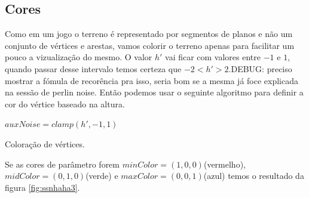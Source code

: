 \subsection{Cores}
Como em um jogo o terreno é representado por segmentos de planos e não um conjunto
de vértices e arestas, vamos colorir o terreno apenas para facilitar um pouco a
vizualização do mesmo. O valor $h'$ vai ficar com valores entre $-1$ e $1$, 
quando passar desse intervalo temos certeza que $-2 < h' > 2$.DEBUG: preciso mostrar
 a fómula de recorência pra isso, seria bom se a mesma já foce explicada na sessão de perlin noise.
Então podemos
usar o seguinte algoritmo para definir a cor do vértice baseado na altura.

\begin{algorithm}[H]\label{alg:colorValuation}
    $auxNoise = clamp(h', -1, 1)$\;
    
    \caption{Coloração de vértices.}
\end{algorithm}

Se as cores de parâmetro forem $minColor = (1, 0, 0)$(vermelho), $midColor = (0, 1, 0)$(verde) e $maxColor = (0, 0, 1)$(azul)
temos o resultado da figura \ref{fig:ssnhaha3}.

